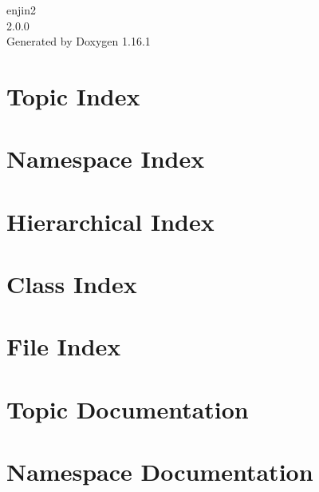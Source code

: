 \documentclass[twoside]{book}
\newcommand{\+}{\discretionary{\mbox{\scriptsize$\hookleftarrow$}}{}{}}
\newcommand{\clearemptydoublepage}{%
    \newpage{\pagestyle{empty}\cleardoublepage}%
  }
\begin{document}
  \raggedbottom
    \hypersetup{pageanchor=false,
                bookmarksnumbered=true,
                pdfencoding=unicode
               }
  \begin{titlepage}
  \vspace*{7cm}
  \begin{center}%
  {\Large enjin2}\\
  [1ex]\large 2.\+0.\+0 \\
  \vspace*{1cm}
  {\large Generated by Doxygen 1.16.1}\\
  \end{center}
  \end{titlepage}
  \clearemptydoublepage
  \tableofcontents
  \clearemptydoublepage
  \hypersetup{pageanchor=true}
\chapter{Topic Index}

\chapter{Namespace Index}

\chapter{Hierarchical Index}

\chapter{Class Index}

\chapter{File Index}

\chapter{Topic Documentation}










\chapter{Namespace Documentation}






\end{document}
